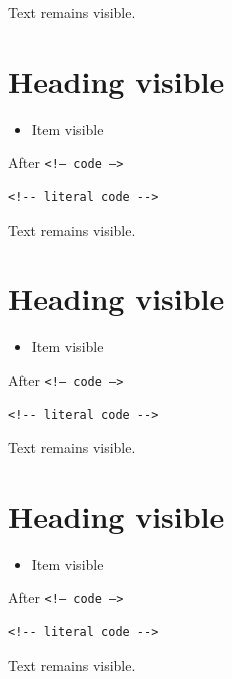 %
%
%
Text  %
remains visible.
\section{Heading  %
visible}
\begin{itemize}
\item Item  %
visible
\end{itemize}
After
\texttt{<!-- code -->}
\begin{verbatim}
<!-- literal code -->
\end{verbatim}
%
%
%
Text  %
remains visible.
\section{Heading  %
visible}
\begin{itemize}
\item Item  %
visible
\end{itemize}
After
\texttt{<!-- code -->}
\begin{verbatim}
<!-- literal code -->
\end{verbatim}
%
%
%
Text  %
remains visible.
\section{Heading  %
visible}
\begin{itemize}
\item Item  %
visible
\end{itemize}
After
\texttt{<!-- code -->}
\begin{verbatim}
<!-- literal code -->
\end{verbatim}
\begin{frame}[t]
%
%
%
Text  %
remains visible.
\end{frame}

